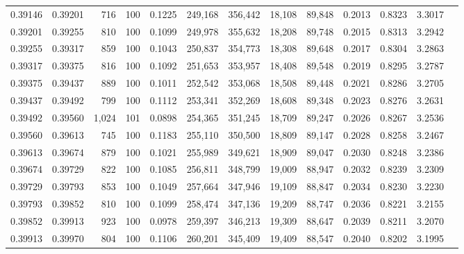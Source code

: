 \begin{tabular}{rrrrrrrrrrrrr}
0.39146 & 0.39201 &   716 & 100 &                                     0.1225 & 249,168 & 356,442 &  18,108 &  89,848 & 0.2013 & 0.8323 & 3.3017 \\
0.39201 & 0.39255 &   810 & 100 &                                     0.1099 & 249,978 & 355,632 &  18,208 &  89,748 & 0.2015 & 0.8313 & 3.2942 \\
0.39255 & 0.39317 &   859 & 100 &                                     0.1043 & 250,837 & 354,773 &  18,308 &  89,648 & 0.2017 & 0.8304 & 3.2863 \\
0.39317 & 0.39375 &   816 & 100 &                                     0.1092 & 251,653 & 353,957 &  18,408 &  89,548 & 0.2019 & 0.8295 & 3.2787 \\
0.39375 & 0.39437 &   889 & 100 &                                     0.1011 & 252,542 & 353,068 &  18,508 &  89,448 & 0.2021 & 0.8286 & 3.2705 \\
0.39437 & 0.39492 &   799 & 100 &                                     0.1112 & 253,341 & 352,269 &  18,608 &  89,348 & 0.2023 & 0.8276 & 3.2631 \\
0.39492 & 0.39560 & 1,024 & 101 &                                     0.0898 & 254,365 & 351,245 &  18,709 &  89,247 & 0.2026 & 0.8267 & 3.2536 \\
0.39560 & 0.39613 &   745 & 100 &                                     0.1183 & 255,110 & 350,500 &  18,809 &  89,147 & 0.2028 & 0.8258 & 3.2467 \\
0.39613 & 0.39674 &   879 & 100 &                                     0.1021 & 255,989 & 349,621 &  18,909 &  89,047 & 0.2030 & 0.8248 & 3.2386 \\
0.39674 & 0.39729 &   822 & 100 &                                     0.1085 & 256,811 & 348,799 &  19,009 &  88,947 & 0.2032 & 0.8239 & 3.2309 \\
0.39729 & 0.39793 &   853 & 100 &                                     0.1049 & 257,664 & 347,946 &  19,109 &  88,847 & 0.2034 & 0.8230 & 3.2230 \\
0.39793 & 0.39852 &   810 & 100 &                                     0.1099 & 258,474 & 347,136 &  19,209 &  88,747 & 0.2036 & 0.8221 & 3.2155 \\
0.39852 & 0.39913 &   923 & 100 &                                     0.0978 & 259,397 & 346,213 &  19,309 &  88,647 & 0.2039 & 0.8211 & 3.2070 \\
0.39913 & 0.39970 &   804 & 100 &                                     0.1106 & 260,201 & 345,409 &  19,409 &  88,547 & 0.2040 & 0.8202 & 3.1995 \\

\end{tabular}
